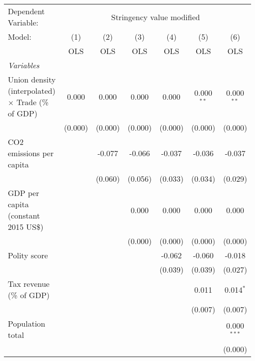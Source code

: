 
\begingroup
\centering
\begin{tabular}{lcccccc}
   \toprule
   Dependent Variable: & \multicolumn{6}{c}{Stringency value modified}\\
   Model:                                                    & (1)     & (2)     & (3)     & (4)     & (5)          & (6)\\  
                                                             &  OLS    & OLS     & OLS     & OLS     & OLS          & OLS\\  
   \midrule
   \emph{Variables}\\
   Union density (interpolated) $\times$ Trade (\% of GDP)   & 0.000   & 0.000   & 0.000   & 0.000   & 0.000$^{**}$ & 0.000$^{**}$\\   
                                                             & (0.000) & (0.000) & (0.000) & (0.000) & (0.000)      & (0.000)\\   
   CO2 emissions per capita                                  &         & -0.077  & -0.066  & -0.037  & -0.036       & -0.037\\   
                                                             &         & (0.060) & (0.056) & (0.033) & (0.034)      & (0.029)\\   
   GDP per capita (constant 2015 US\$)                       &         &         & 0.000   & 0.000   & 0.000        & 0.000\\   
                                                             &         &         & (0.000) & (0.000) & (0.000)      & (0.000)\\   
   Polity score                                              &         &         &         & -0.062  & -0.060       & -0.018\\   
                                                             &         &         &         & (0.039) & (0.039)      & (0.027)\\   
   Tax revenue (\% of GDP)                                   &         &         &         &         & 0.011        & 0.014$^{*}$\\   
                                                             &         &         &         &         & (0.007)      & (0.007)\\   
   Population total                                          &         &         &         &         &              & 0.000$^{***}$\\   
                                                             &         &         &         &         &              & (0.000)\\   

\end{tabular}
